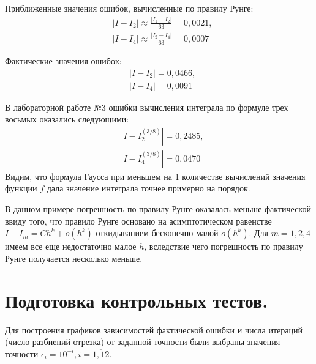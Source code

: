 \documentclass[a4paper, 12pt]{article}
\begin{document}
	Приближенные значения ошибок, вычисленные по правилу Рунге:
	\begin{equation*}
		\begin{aligned}
			&|I-I_2|\approx\frac{|I_1-I_2|}{63}=0,0021,\\
			&|I-I_4|\approx\frac{|I_2-I_4|}{63}=0,0007
		\end{aligned}
	\end{equation*}

	Фактические значения ошибок:
	\begin{equation*}
		\begin{aligned}
			&|I-I_2|=0,0466,\\
			&|I-I_4|=0,0091
		\end{aligned}
	\end{equation*}

	В лабораторной работе №3 ошибки вычисления интеграла по формуле трех восьмых оказались следующими:
	\begin{equation*}
		\begin{aligned}
			&|I-I_2^{(3/8)}|=0,2485,\\
			&|I-I_4^{(3/8)}|=0,0470
		\end{aligned}
	\end{equation*}
	Видим, что формула Гаусса при меньшем на 1 количестве вычислений значения функции $f$ дала значение интеграла точнее примерно на порядок.
	
	В данном примере погрешность по правилу Рунге оказалась меньше фактической ввиду того, что правило Рунге основано на асимптотическом равенстве $I-I_m=Ch^k+o(h^k)$ откидыванием бесконечно малой $o(h^k)$. Для $m=1,2,4$ имеем все еще недостаточно малое $h$, вследствие чего погрешность по правилу Рунге получается несколько меньше. 
	
	\section{Подготовка контрольных тестов.}
	
	Для построения графиков зависимостей фактической ошибки и числа итераций (число разбиений отрезка) от заданной точности были выбраны значения точности $\epsilon_i=10^{-i}, i=\overline{1,12}$. 
	
\end{document}
